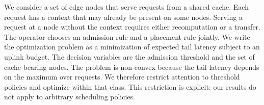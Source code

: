 We consider a set of edge nodes that serve requests from a shared cache.
Each request has a context that may already be present on some nodes.
Serving a request at a node without the context requires either recomputation or a transfer.
The operator chooses an admission rule and a placement rule jointly.
We write the optimization problem as a minimization of expected tail latency subject to an uplink budget.
The decision variables are the admission threshold and the set of cache-bearing nodes.
The problem is non-convex because the tail latency depends on the maximum over requests.
We therefore restrict attention to threshold policies and optimize within that class.
This restriction is explicit: our results do not apply to arbitrary scheduling policies.
